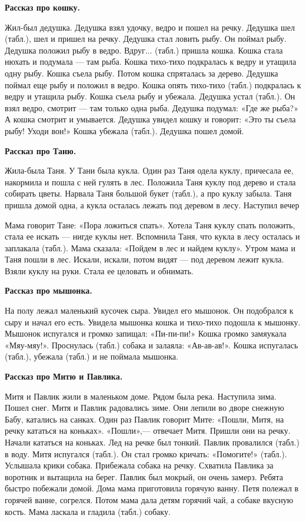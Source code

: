 \documentclass{book}
\begin{document}
\textbf{Рассказ про кошку.}

Жил-был дедушка. Дедушка взял удочку, ведро и пошел на речку. Дедушка
шел (табл.), шел и пришел на речку. Дедушка стал ловить рыбу. Он поймал
рыбу. Дедушка положил рыбу в ведро. Вдруг... (табл.) пришла кошка. Кошка
стала нюхать и подумала --- там рыба. Кошка тихо-тихо подкралась к ведру
и утащила одну рыбу. Кошка съела рыбу. Потом кошка спряталась за дерево.
Дедушка поймал еще рыбу и положил в ведро. Кошка опять тихо-тихо (табл.)
подкралась к ведру и утащила рыбу. Кошка съела рыбу и убежала. Дедушка
устал (табл.). Он взял ведро, смотрит --- там только одна рыба. Дедушка
подумал: «Где же рыба?» А кошка смотрит и умывается. Дедушка увидел
кошку и говорит: «Это ты съела рыбу! Уходи вон!» Кошка убежала (табл.).
Дедушка пошел домой.

\textbf{Рассказ про Таню.}

Жила-была Таня. У Тани была кукла. Один раз Таня одела куклу, причесала
ее, накормила и пошла с ней гулять в лес. Положила Таня куклу под дерево
и стала собирать цветы. Нарвала Таня большой букет (табл.), а про куклу
забыла. Таня пришла домой одна, а кукла осталась лежать под деревом в
лесу. Наступил вечер

Мама говорит Тане: «Пора ложиться спать». Хотела Таня куклу спать
положить, стала ее искать --- нигде куклы нет. Вспомнила Таня, что кукла
в лесу осталась и заплакала (табл.). Мама сказала: «Пойдем в лес и
найдем куклу». Утром мама и Таня пошли в лес. Искали, искали, потом
видят --- под деревом лежит кукла. Взяли куклу на руки. Стала ее
целовать и обнимать.

\textbf{Рассказ про мышонка.}

На полу лежал маленький кусочек сыра. Увидел его мышонок. Он подобрался
к сыру и начал его есть. Увидела мышонка кошка и тихо-тихо подошла к
мышонку. Мышонок испугался и громко запищал: «Пи-пи-пи!» Кошка громко
замяукала «Мяу-мяу!». Проснулась (табл.) собака и залаяла: «Ав-ав-ав!».
Кошка испугалась (табл.), убежала (табл.) и не поймала мышонка.

\textbf{Рассказ про Митю и Павлика.}

Митя и Павлик жили в маленьком доме. Рядом была река. Наступила зима.
Пошел снег. Митя и Павлик радовались зиме. Они лепили во дворе снежную
Бабу, катались на санках. Один раз Павлик говорит Мите: «Пошли, Митя, на
речку кататься на коньках». «Пошли»,--- отвечает Митя. Пришли они на
речку. Начали кататься на коньках. Лед на речке был тонкий. Павлик
провалился (табл.) в воду. Митя испугался (табл.). Он стал громко
кричать: «Помогите!» (табл.). Услышала крики собака. Прибежала собака на
речку. Схватила Павлика за воротник и вытащила на берег. Павлик был
мокрый, он очень замерз. Ребята быстро побежали домой. Дома мама
приготовила горячую ванну. Петя полежал в горячей ванне, согрелся. Потом
мама дала детям горячий чай, а собаке вкусную кость. Мама ласкала и
гладила (табл.) собаку.
\end{document}
